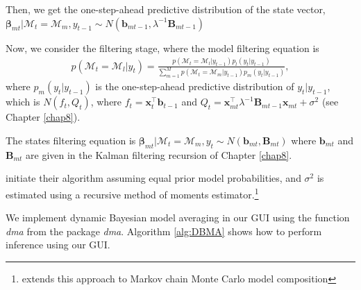 Then, we get the one-step-ahead predictive distribution of the state vector, $\bm{\beta}_{mt}|\mathcal{M}_{t}=\mathcal{M}_{m},y_{t-1}\sim N(\bm{b}_{mt-1},\lambda^{-1}\bm{B}_{mt-1})$ 

Now, we consider the filtering stage, where the model filtering equation is 
\begin{align*}
	p(\mathcal{M}_t=\mathcal{M}_l|y_{t})=\frac{p(\mathcal{M}_t=\mathcal{M}_l|y_{t-1})p_l(y_t|y_{t-1})}{\sum_{m=1}^M p(\mathcal{M}_t=\mathcal{M}_m|y_{t-1})p_m(y_t|y_{t-1})},
\end{align*}
where $p_m(y_t|y_{t-1})$ is the one-step-ahead predictive distribution of $y_t|{y}_{t-1}$, which is $N(f_t,Q_t)$, where $f_t=\bm{x}_t^{\top}\bm{b}_{t-1}$ and $Q_t=\bm{x}_{mt}^{\top}\lambda^{-1}\bm{B}_{mt-1}\bm{x}_{mt}+\sigma^2$ (see Chapter \ref{chap8}).

The states filtering equation is $\bm{\beta}_{mt}|\mathcal{M}_{t}=\mathcal{M}_{m},y_{t}\sim N(\bm{b}_{mt},\bm{B}_{mt})$ where $\bm{b}_{mt}$ and $\bm{B}_{mt}$ are given in the Kalman filtering recursion of Chapter \ref{chap8}.

\cite{raftery2010online} initiate their algorithm assuming equal prior model probabilities, and $\sigma^2$ is estimated using a recursive method of moments estimator.\footnote{\cite{ramirez2020dynamic} extends this approach to Markov chain Monte Carlo model composition}

We implement dynamic Bayesian model averaging in our GUI using the function \textit{dma} from the package \textit{dma}. Algorithm \ref{alg:DBMA} shows how to perform inference using our GUI.

